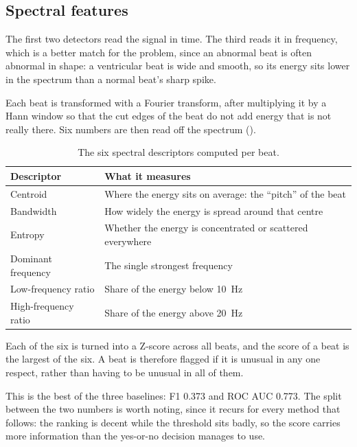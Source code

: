 \documentclass[a4paper, 12pt]{article}
\begin{document}
\subsection{Spectral features} \label{subsec:spectral}

The first two detectors read the signal in time. The third reads it in frequency,
which is a better match for the problem, since an abnormal beat is often abnormal
in shape: a ventricular beat is wide and smooth, so its energy sits lower in the
spectrum than a normal beat's sharp spike.

Each beat is transformed with a Fourier transform, after multiplying it by a Hann
window so that the cut edges of the beat do not add energy that is not really
there. Six numbers are then read off the spectrum ().

\begin{table}[htbp]
  \centering
  \small
  \caption{The six spectral descriptors computed per beat.}
  \label{tab:spectralfeat}
  \begin{tabular}{@{}lp{}@{}}
    \toprule
    \textbf{Descriptor} & \textbf{What it measures} \\
    \midrule
    Centroid   & Where the energy sits on average: the ``pitch'' of the beat \\
    Bandwidth  & How widely the energy is spread around that centre \\
    Entropy    & Whether the energy is concentrated or scattered everywhere \\
    Dominant frequency & The single strongest frequency \\
    Low-frequency ratio  & Share of the energy below \SI{10}{\hertz} \\
    High-frequency ratio & Share of the energy above \SI{20}{\hertz} \\
    \bottomrule
  \end{tabular}
\end{table}

Each of the six is turned into a Z-score across all beats, and the score of a beat
is the largest of the six. A beat is therefore flagged if it is unusual in any one
respect, rather than having to be unusual in all of them.

This is the best of the three baselines: F1 \num{0.373} and ROC AUC \num{0.773}.
The split between the two numbers is worth noting, since it recurs for every method
that follows: the ranking is decent while the threshold sits badly, so the score
carries more information than the yes-or-no decision manages to use.
\end{document}

